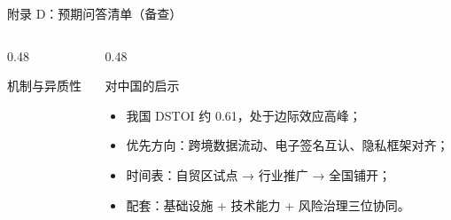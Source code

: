 \documentclass[aspectratio=169,10pt]{ctexbeamer}
\begin{document}
\begin{frame}{附录 D：预期问答清单（备查）}
\begin{columns}[T,totalwidth=\textwidth]
\begin{column}{0.48\textwidth}
\begin{block}{机制与异质性}
\begin{itemize}
        \end{itemize}
      \end{block}
    \end{column}
    \begin{column}{0.48\textwidth}
      \begin{block}{对中国的启示}
        \begin{itemize}\scriptsize
          \item 我国 DSTOI 约 0.61，处于\alert{边际效应高峰}；
          \item 优先方向：跨境数据流动、电子签名互认、隐私框架对齐；
          \item 时间表：自贸区试点 → 行业推广 → 全国铺开；
          \item 配套：基础设施 + 技术能力 + 风险治理三位协同。
        \end{itemize}
      \end{block}
    \end{column}
  \end{columns}
\end{frame}
\end{document}
